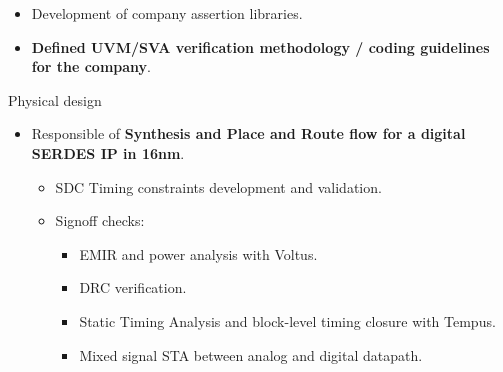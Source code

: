 \begin{cventries}
{\begin{cvitems}
\begin{itemize}
\begin{itemize}
            \item {Development of company assertion libraries.}
            \item {\textbf{Defined UVM/SVA verification methodology / coding guidelines for the company}.}
          \end{itemize}
        \end{itemize}
        \item {Physical design}
        \begin{itemize}
          \item {Responsible of \textbf{Synthesis and Place and Route flow for a digital SERDES IP in 16nm}.}
          \begin{itemize}
            \item {SDC Timing constraints development and validation.}
            \item {Signoff checks:}
            \begin{itemize}
              \item {EMIR and power analysis with Voltus.}
              \item {DRC verification.}
              \item {Static Timing Analysis and block-level timing closure with Tempus.}
              \item {Mixed signal STA between analog and digital datapath.}
            \end{itemize}
          \end{itemize}
        \end{itemize}
      \end{cvitems}
    }



\end{cventries}
